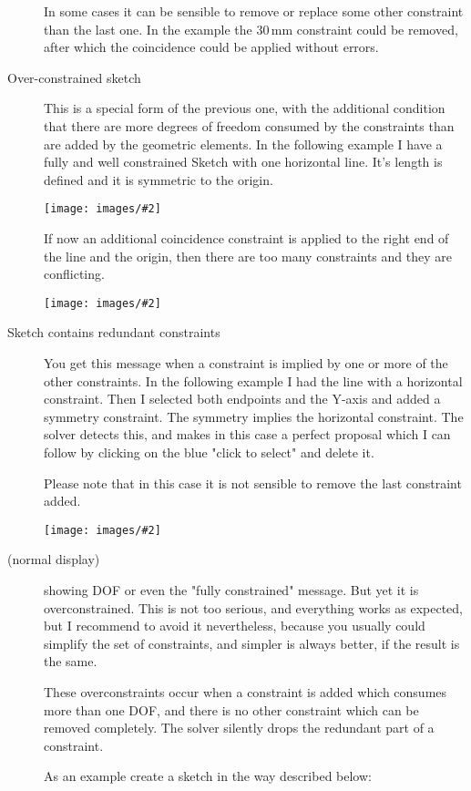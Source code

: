 \documentclass[12pt,titlepage]{article}
\newcommand{\img}[2]{\vspace{2ex}\noindent\texttt{[image: images/\#2]}}
\begin{document}
\begin{description}
	In some cases it can be sensible to remove or replace some other constraint than the last one. In the example the 30\,mm constraint could be removed, after which the coincidence could be applied without errors.
	
	
\item [Over-constrained sketch] This is a special form of the previous one, with the additional condition that there are more degrees of freedom consumed by the constraints than are added by the geometric elements. In the following example I have a fully and well constrained Sketch with one horizontal line. It's length is defined and it is symmetric to the origin.
	
	\img{}{ConstraintsSolverOver1}
	
	If now an additional coincidence constraint is applied to the right end of the line and the origin, then there are too many constraints and they are conflicting.
	
	\img{}{ConstraintsSolverOver2}
	
	
	
\item [Sketch contains redundant constraints]You get this message when a constraint is implied by one or more of the other constraints. In the following example I had the line with a horizontal constraint. Then I selected both endpoints and the Y-axis and added a symmetry constraint. The symmetry implies the horizontal constraint. The solver detects this, and makes in this case a perfect proposal which I can follow by clicking on the blue "click to select" and delete it.
	
	Please note that in this case it is not sensible to remove the last constraint added.
	
	\img{}{ConstraintsSolverRedundant}
	
	
\item [(normal display)] showing DOF or even the "fully constrained" message. But yet it is over\-con\-strained. This is not too serious, and everything works as expected, but I recommend to avoid it nevertheless, because you usually could simplify the set of constraints, and simpler is always better, if the result is the same.
	
	These overconstraints occur when a constraint is added which consumes more than one DOF, and there is no other constraint which can be removed completely. The solver silently drops the redundant part of a constraint.
	
	As an example create a sketch in the way described below:
	

\end{description}
\end{document}
